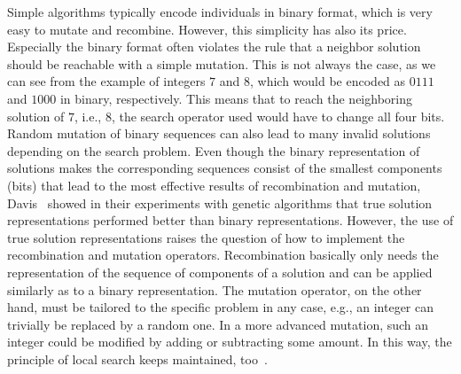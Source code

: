 \documentclass[paper=a4,%
  twoside,%
  BCOR4mm,%
  abstract=true,%
  toc=bibliography,%
  chapterprefix=true,%
  toc=bibliographynumbered,%
  open=right,%
  english,%
  pagesize=pdftex]{scrreprt}
\begin{document}
Simple algorithms typically encode individuals in binary format, which is very easy to mutate and recombine. However, this simplicity has also its price. Especially the binary format often violates the rule that a neighbor solution should be reachable with a simple mutation. This is not always the case, as we can see from the example of integers $7$ and $8$,  which would be encoded as $0111$ and $1000$ in binary, respectively. This means that to reach the neighboring solution of $7$, i.e., $8$, the search operator used would have to change all four bits. Random mutation of binary sequences can also lead to many invalid solutions depending on the search problem. Even though the binary representation of solutions makes the corresponding sequences consist of the smallest components (bits) that lead to the most effective results of recombination and mutation, Davis~\cite{Davis1991} showed in their experiments with genetic algorithms that true solution representations performed better than binary representations. However, the use of true solution representations raises the question of how to implement the recombination and mutation operators. Recombination basically only needs the representation of the sequence of components of a solution and can be applied similarly as to a binary representation. The mutation operator, on the other hand, must be tailored to the specific problem in any case, e.g., an integer can trivially be replaced by a random one. In a more advanced mutation, such an integer could be modified by adding or subtracting some amount. In this way, the principle of local search keeps maintained, too~\cite{Davis1991}.
\end{document}
